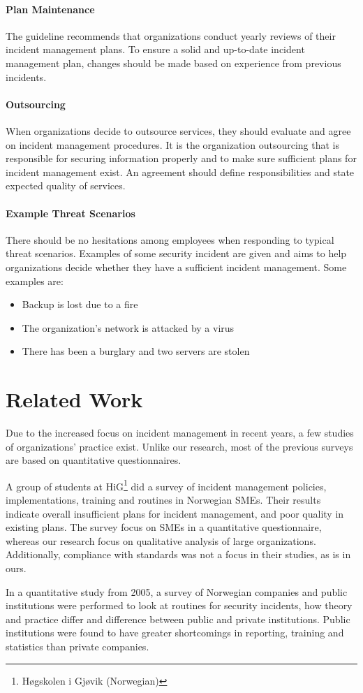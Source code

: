 \paragraph{Plan Maintenance}
The guideline recommends that organizations conduct yearly reviews of their incident management plans. To ensure a solid and up-to-date incident management plan, changes should be made based on experience from previous incidents. 

\paragraph{Outsourcing}
When organizations decide to outsource services, they should evaluate and agree on incident management procedures. It is the organization outsourcing that is responsible for securing information properly and to make sure sufficient plans for incident management exist. An agreement should define responsibilities and state expected quality of services. 

\paragraph{Example Threat Scenarios}
There should be no hesitations among employees when responding to typical threat scenarios. Examples of some security incident are given and aims to help organizations decide whether they have a sufficient incident management. Some examples are:
\begin{itemize}
\item Backup is lost due to a fire
\item The organization's network is attacked by a virus
\item There has been a burglary and two servers are stolen 
\end{itemize}



\section{Related Work}
Due to the increased focus on incident management in recent years, a few studies of organizations' practice exist. Unlike our research, most of the previous surveys are based on quantitative questionnaires.

A group of students at HiG\footnote{H\o gskolen i Gj\o vik (Norwegian)} did a survey of incident management policies, implementations, training and routines in Norwegian \acp{SME}. Their results indicate overall insufficient plans for incident management, and poor quality in existing plans. The survey focus on \acp{SME}  in a quantitative questionnaire, whereas our research focus on qualitative analysis of large organizations. Additionally, compliance with standards was not a focus in their studies, as is in ours.

In a quantitative study from 2005\cite{brage}, a survey of Norwegian companies and public institutions were performed to look at routines for security incidents, how theory and practice differ and difference between public and private institutions. Public institutions were found to have greater shortcomings in reporting, training and statistics than private companies. 